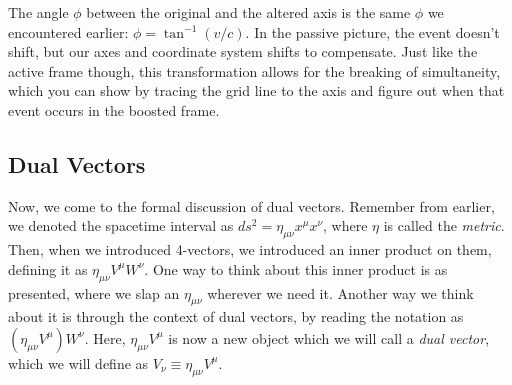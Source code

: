 \begin{center}
\end{center}
The angle \( \phi \) between the original and the altered axis is the same \( \phi \) we encountered earlier:
\( \phi = \tan^{-1}(v / c) \). In the passive picture, the event doesn't shift, but our axes and coordinate system
shifts to compensate. Just like the active frame though, this transformation allows for the breaking of
simultaneity, which you can show by tracing the grid line to the axis and figure out when that event occurs
in the boosted frame.  

\subsection{Dual Vectors}
Now, we come to the formal discussion of dual vectors. Remember from earlier, we denoted the spacetime
interval as \( ds^2 = \eta_{\mu \nu} x^{\mu}x^{\nu} \), where \( \eta \) is called the \textit{metric}. Then,
when we introduced 4-vectors, we introduced an inner product on them, defining it as \( \eta_{\mu \nu
}V^{\mu}W^{\nu} \). One way to think about this inner product is as presented, where we slap an \( \eta_{\mu
\nu} \) wherever we need it. Another way we think about it is through the context of dual vectors, by reading
the notation as \( (\eta_{\mu \nu}V^{\mu}) W^{\nu} \). Here, \( \eta_{\mu \nu}V^{\mu} \) is now a new object
which we will call a \textit{dual vector}, which we will define as \( V_{\nu} \equiv \eta_{\mu \nu}V^{\mu}
\).  


